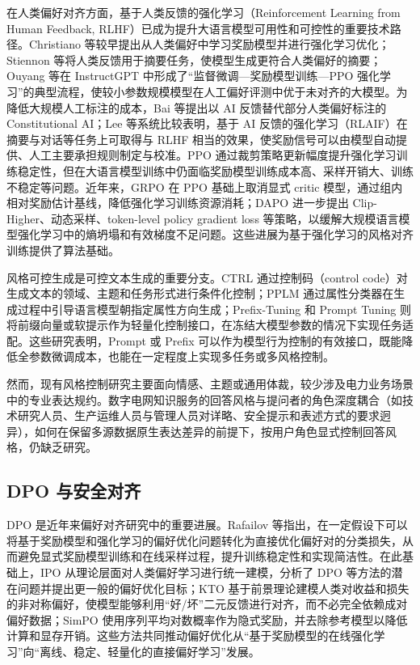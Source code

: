 \documentclass[fontset=fandol,type=master,campus=shenzhen,etitleauto=true]{hithesisbook}
\begin{document}
在人类偏好对齐方面，基于人类反馈的强化学习（Reinforcement Learning from Human Feedback, RLHF）已成为提升大语言模型可用性和可控性的重要技术路径。Christiano 等较早提出从人类偏好中学习奖励模型并进行强化学习优化\cite{ref30}；Stiennon 等将人类反馈用于摘要任务，使模型生成更符合人类偏好的摘要\cite{ref31}；Ouyang 等在 InstructGPT 中形成了“监督微调—奖励模型训练—PPO 强化学习”的典型流程，使较小参数规模模型在人工偏好评测中优于未对齐的大模型\cite{ref32}。为降低大规模人工标注的成本，Bai 等提出以 AI 反馈替代部分人类偏好标注的 Constitutional AI\cite{ref44}；Lee 等系统比较表明，基于 AI 反馈的强化学习（RLAIF）在摘要与对话等任务上可取得与 RLHF 相当的效果\cite{ref90}，使奖励信号可以由模型自动提供、人工主要承担规则制定与校准。PPO 通过裁剪策略更新幅度提升强化学习训练稳定性\cite{ref33}，但在大语言模型训练中仍面临奖励模型训练成本高、采样开销大、训练不稳定等问题。近年来，GRPO 在 PPO 基础上取消显式 critic 模型，通过组内相对奖励估计基线，降低强化学习训练资源消耗\cite{ref34}；DAPO 进一步提出 Clip-Higher、动态采样、token-level policy gradient loss 等策略，以缓解大规模语言模型强化学习中的熵坍塌和有效梯度不足问题\cite{ref35}。这些进展为基于强化学习的风格对齐训练提供了算法基础。

风格可控生成是可控文本生成的重要分支。CTRL 通过控制码（control code）对生成文本的领域、主题和任务形式进行条件化控制\cite{ref36}；PPLM 通过属性分类器在生成过程中引导语言模型朝指定属性方向生成\cite{ref37}；Prefix-Tuning 和 Prompt Tuning 则将前缀向量或软提示作为轻量化控制接口，在冻结大模型参数的情况下实现任务适配\cite{ref38,ref39}。这些研究表明，Prompt 或 Prefix 可以作为模型行为控制的有效接口，既能降低全参数微调成本，也能在一定程度上实现多任务或多风格控制。

然而，现有风格控制研究主要面向情感、主题或通用体裁，较少涉及电力业务场景中的专业表达规约。数字电网知识服务的回答风格与提问者的角色深度耦合（如技术研究人员、生产运维人员与管理人员对详略、安全提示和表述方式的要求迥异），如何在保留多源数据原生表达差异的前提下，按用户角色显式控制回答风格，仍缺乏研究。

\subsection{DPO 与安全对齐}

DPO 是近年来偏好对齐研究中的重要进展。Rafailov 等指出，在一定假设下可以将基于奖励模型和强化学习的偏好优化问题转化为直接优化偏好对的分类损失，从而避免显式奖励模型训练和在线采样过程，提升训练稳定性和实现简洁性\cite{ref40}。在此基础上，IPO 从理论层面对人类偏好学习进行统一建模，分析了 DPO 等方法的潜在问题并提出更一般的偏好优化目标\cite{ref41}；KTO 基于前景理论建模人类对收益和损失的非对称偏好，使模型能够利用“好/坏”二元反馈进行对齐，而不必完全依赖成对偏好数据\cite{ref42}；SimPO 使用序列平均对数概率作为隐式奖励，并去除参考模型以降低计算和显存开销\cite{ref43}。这些方法共同推动偏好优化从“基于奖励模型的在线强化学习”向“离线、稳定、轻量化的直接偏好学习”发展。
\end{document}

